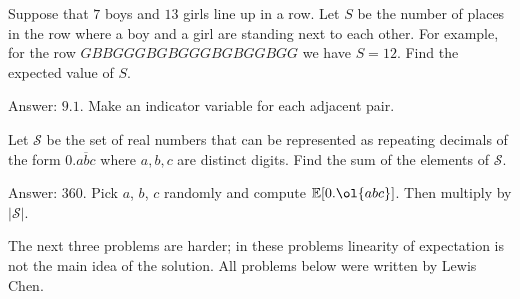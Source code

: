 \documentclass[11pt]{scrartcl}
\newcommand\EE{\mathbb E}
\begin{document}
\begin{problem}
  [AHSME 1989] Suppose that $7$ boys and $13$ girls line up in a row. Let $S$ be the number of places in the row where a boy and a girl are standing next to each other. For example, for the row $GBBGGGBGBGGGBGBGGBGG$ we have $S = 12$. Find the expected value of $S$.  %
  \begin{sketch}
    Answer: $9.1$. Make an indicator variable for each adjacent pair.
  \end{sketch}
\end{problem}
\begin{problem}
  [AIME 2006 \#6] Let $\mathcal{S}$ be the set of real numbers that can be represented as repeating decimals of the form $0.\overline{abc}$ where $a, b, c$ are distinct digits.  Find the sum of the elements of $\mathcal{S}$. %
  \begin{sketch}
    Answer: $360$. Pick $a$, $b$, $c$ randomly and compute $\EE[0.\ol{abc}]$. Then multiply by $\left\lvert \mathcal S \right\rvert$.
  \end{sketch}
\end{problem}

The next three problems are harder; in these problems linearity of expectation
is not the main idea of the solution.
All problems below were written by Lewis Chen.
\end{document}

